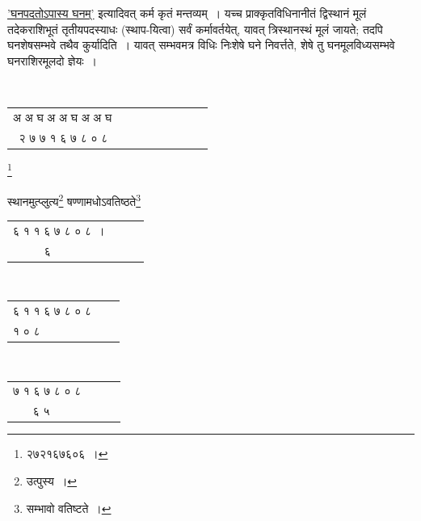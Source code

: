 \documentclass[10pt, openany]{book}
\begin{document}
\newpage

{\hyperref[29]{'घनपदतोऽपास्य घनम्'} इत्यादिवत् कर्म कृतं मन्तव्यम्~। यच्च
प्राक्कृतविधिनानीतं द्विस्थानं}
{मूलं तदेकराशिभूतं तृतीयपदस्याधः (स्थाप-यित्वा) सर्वं कर्मावर्तयेत्,
यावत् त्रिस्थानस्थं}
{मूलं जायते; तदपि घनशेषसम्भवे तथैव कुर्यादिति~। यावत् सम्भवमत्र विधिः
निःशेषे घने}
{निवर्त्तते, शेषे तु घनमूलविध्यसम्भवे घनराशिरमूलदो ज्ञेयः~।}

\vspace{0.2cm}{उदाहरणम्\textendash \,प्राक्तनस्य घनराशेर्न्यासः\textemdash}\\

\renewcommand*{\arraystretch}{0.7}
\centering\begin{tabular}{ccccccccc}
    
अ अ घ अ अ घ अ अ घ \\
\,२\: ७\: ७\: १\: ६\: ७\: ८\: ०\: ८ \end{tabular} 
\vspace{-5mm}

\hspace{34mm} \renewcommand{\thefootnote}{\s १}\footnote{\s २७२१६७६०६~।}
\vspace{2mm}

{स्थानमुत्प्लुत्य\renewcommand{\thefootnote}{\s २}\footnote{\s उत्पुस्य~।} षण्णामधोऽवतिष्ठते\renewcommand{\thefootnote}{\s ३}\footnote{\s सम्भावो वतिष्टते~।}}\begin{tabular}{cccl} ६  १  १  ६  ७  ८  ०  ८~।  \\
 ६~~~~
\end{tabular}

\\

\centering\begin{tabular}{lll}{६ १ १ ६ ७ ८ ० ८}\\
 {१ ० ८}\end{tabular}

\\

\centering\begin{tabular}
{ccll} ७ १ ६ ७ ८ ० ८ \\

 ६ ५~~ \end{tabular}
\end{document}
